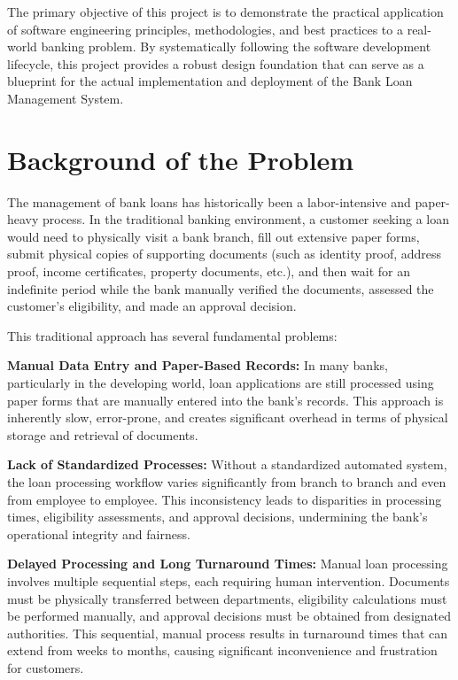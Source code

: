 The primary objective of this project is to demonstrate the practical application of software engineering principles, methodologies, and best practices to a real-world banking problem. By systematically following the software development lifecycle, this project provides a robust design foundation that can serve as a blueprint for the actual implementation and deployment of the Bank Loan Management System.

\section{Background of the Problem}

The management of bank loans has historically been a labor-intensive and paper-heavy process. In the traditional banking environment, a customer seeking a loan would need to physically visit a bank branch, fill out extensive paper forms, submit physical copies of supporting documents (such as identity proof, address proof, income certificates, property documents, etc.), and then wait for an indefinite period while the bank manually verified the documents, assessed the customer's eligibility, and made an approval decision.

This traditional approach has several fundamental problems:

\textbf{Manual Data Entry and Paper-Based Records:} In many banks, particularly in the developing world, loan applications are still processed using paper forms that are manually entered into the bank's records. This approach is inherently slow, error-prone, and creates significant overhead in terms of physical storage and retrieval of documents.

\textbf{Lack of Standardized Processes:} Without a standardized automated system, the loan processing workflow varies significantly from branch to branch and even from employee to employee. This inconsistency leads to disparities in processing times, eligibility assessments, and approval decisions, undermining the bank's operational integrity and fairness.

\textbf{Delayed Processing and Long Turnaround Times:} Manual loan processing involves multiple sequential steps, each requiring human intervention. Documents must be physically transferred between departments, eligibility calculations must be performed manually, and approval decisions must be obtained from designated authorities. This sequential, manual process results in turnaround times that can extend from weeks to months, causing significant inconvenience and frustration for customers.

